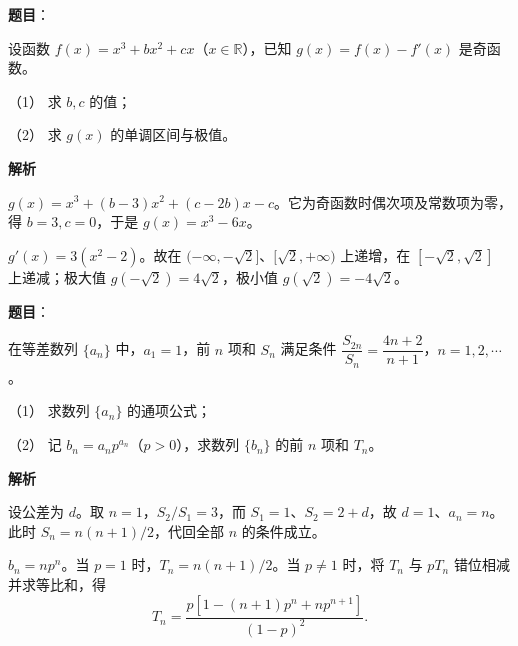 \begin{answer}

\textbf{题目}：

设函数 $f(x)=x^3+bx^2+cx$（$x\in\mathbb R$），已知 $g(x)=f(x)-f'(x)$ 是奇函数。

（1） 求 $b,c$ 的值；

（2） 求 $g(x)$ 的单调区间与极值。

\textbf{解析}


$g(x)=x^3+(b-3)x^2+(c-2b)x-c$。它为奇函数时偶次项及常数项为零，得 $b=3,c=0$，于是 $g(x)=x^3-6x$。


$g'(x)=3(x^2-2)$。故在 $(-\infty,-\sqrt2]$、$[\sqrt2,+\infty)$ 上递增，在 $[-\sqrt2,\sqrt2]$ 上递减；极大值 $g(-\sqrt2)=4\sqrt2$，极小值 $g(\sqrt2)=-4\sqrt2$。


\gkanswer{答案（2）：增区间为 $(-\infty,-\sqrt2]$ 和 $[\sqrt2,+\infty)$，减区间为 $[-\sqrt2,\sqrt2]$；极大值 $4\sqrt2$，极小值 $-4\sqrt2$。}

\end{answer}
\begin{answer}

\textbf{题目}：

在等差数列 $\{a_n\}$ 中，$a_1=1$，前 $n$ 项和 $S_n$ 满足条件 $\dfrac{S_{2n}}{S_n}=\dfrac{4n+2}{n+1}$，$n=1,2,\cdots$。

（1） 求数列 $\{a_n\}$ 的通项公式；

（2） 记 $b_n=a_np^{a_n}$（$p>0$），求数列 $\{b_n\}$ 的前 $n$ 项和 $T_n$。

\textbf{解析}


设公差为 $d$。取 $n=1$，$S_2/S_1=3$，而 $S_1=1$、$S_2=2+d$，故 $d=1$、$a_n=n$。此时 $S_n=n(n+1)/2$，代回全部 $n$ 的条件成立。


$b_n=np^n$。当 $p=1$ 时，$T_n=n(n+1)/2$。当 $p\ne1$ 时，将 $T_n$ 与 $pT_n$ 错位相减并求等比和，得
\nopagebreak[4]
\[
T_n=\frac{p[1-(n+1)p^n+np^{n+1}]}{(1-p)^2}.
\]



\end{answer}
